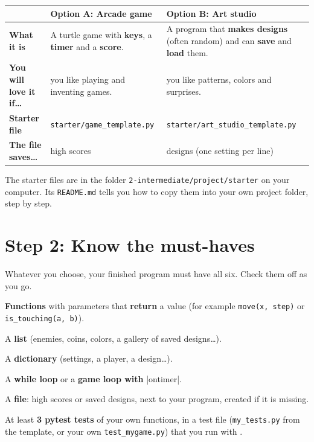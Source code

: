 \documentclass[level=2]{kidscode}
\begin{document}
\begin{center}
\end{center}

\begin{tabularx}{\linewidth}{@{}>{\bfseries}p{3.2cm}XX@{}}
\toprule
 & Option A: Arcade game & Option B: Art studio \\ \midrule
What it is & A turtle game with \textbf{keys}, a \textbf{timer} and a \textbf{score}. & A program that \textbf{makes designs} (often random) and can \textbf{save} and \textbf{load} them. \\
You will love it if\ldots & you like playing and inventing games. & you like patterns, colors and surprises. \\
Starter file & \texttt{starter/\allowbreak game\_template.py} & \texttt{starter/\allowbreak art\_studio\_template.py} \\
The file saves\ldots & high scores & designs (one setting per line) \\
\bottomrule
\end{tabularx}

\noindent The starter files are in the folder \texttt{2-intermediate/\allowbreak project/\allowbreak starter} on your computer.
Its \texttt{README.md} tells you how to copy them into your own project folder, step by step.

\section{Step 2: Know the must-haves}
Whatever you choose, your finished program must have all six. Check them off as you go.
\begin{checklist}
  \item \textbf{Functions} with parameters that \textbf{return} a value (for example \texttt{move(x, step)} or \texttt{is\_touching(a, b)}).
  \item A \textbf{list} (enemies, coins, colors, a gallery of saved designs\ldots).
  \item A \textbf{dictionary} (settings, a player, a design\ldots).
  \item A \textbf{while loop} or a \textbf{game loop with} \py|ontimer|.
  \item A \textbf{file}: high scores or saved designs, next to your program, created if it is missing.
  \item At least \textbf{3 pytest tests} of your own functions, in a test file (\texttt{my\_tests.py} from the
        template, or your own \texttt{test\_mygame.py}) that you run with .
\end{checklist}
\end{document}
